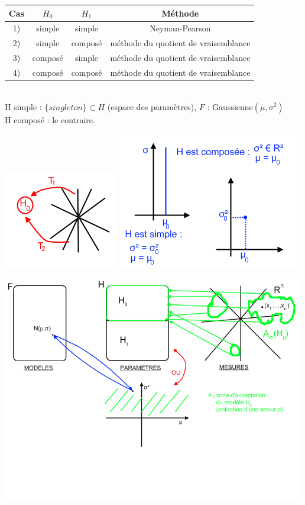 \documentclass{article}
\begin{document}
\begin{tabular}{|*{4}{c|}}
\hline
Cas & $H_0$ & $H_1$ & Méthode\\
\hline
1) & simple & simple & Neyman-Pearson \\
\hline
2) & simple & composé & méthode du quotient de vraisemblance\\
\hline
3) & composé & simple & méthode du quotient de vraisemblance\\
\hline
4) & composé & composé & méthode du quotient de vraisemblance\\
\hline
\end{tabular} \\

\noindent H simple : $\{singleton\} \subset H$ (espace des paramètres), $F$ : Gaussienne$(\mu,\sigma^2)$ \\
H composé : le contraire.

\includegraphics{Figure2-16.png}
\includegraphics{Figure2-18.png}

\includegraphics[width=500px]{Figure2-17.png}
\end{document}
